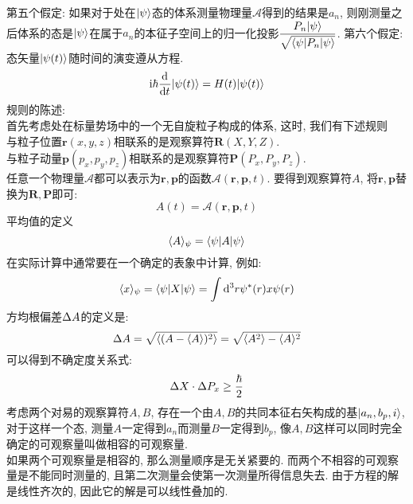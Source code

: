 \documentclass[UTF8]{ctexart}
\numberwithin{equation}{subsection}
\begin{document}
第五个假定: 如果对于处在$| {\psi} \rangle$态的体系测量物理量$\mathscr{A}$得到的结果是$a_n$, 则刚测量之后体系的态是$| {\psi} \rangle$在属于$a_n$的本征子空间上的归一化投影$\displaystyle \frac{P_n| {\psi} \rangle}{\sqrt{\langle {\psi|P_n|\psi} \rangle}}$.
第六个假定: 态矢量$| {\psi(t)} \rangle$随时间的演变遵从\sch 方程.
$$\mathrm{i}\hbar\frac{\mathrm{d}^{} }{\mathrm{d} t^{}}| {\psi(t)} \rangle=H(t)| {\psi(t)} \rangle$$
规则的陈述: \\
首先考虑处在标量势场中的一个无自旋粒子构成的体系, 这时, 我们有下述规则\\
与粒子位置$\bm{r}(x,y,z)$相联系的是观察算符$\bm{R}(X,Y,Z)$. \\
与粒子动量$\bm{p}(p_x,p_y,p_z)$相联系的是观察算符$\bm{P}(P_x,P_y,P_z)$.\\
任意一个物理量$\mathscr{A}$都可以表示为$\bm{r},\bm{p}$的函数$\mathscr{A}(\bm{r},\bm{p},t)$. 要得到观察算符$A$, 将$\bm{r},\bm{p}$替换为$\bm{R},\bm{P}$即可: 
$$A(t)=\mathscr{A}(\bm{r},\bm{p},t)$$
平均值的定义
$$\langle {A} \rangle_\psi=\langle {\psi|A|\psi} \rangle$$
在实际计算中通常要在一个确定的表象中计算, 例如:
$$\langle {x} \rangle_\psi=\langle {\psi|X|\psi} \rangle=\int\mathop{}\!\mathrm{d}^3r \psi^*(r)x\psi(r)$$
方均根偏差$\Delta A$的定义是: 
$$\Delta A=\sqrt{\langle {(A-\langle {A} \rangle)^2} \rangle}=\sqrt{\langle {A^2} \rangle-\langle {A} \rangle^2}$$
可以得到不确定度关系式:
$$\Delta X\cdot \Delta P_x \geq \frac{\hbar}{2}$$
考虑两个对易的观察算符$A,B$, 存在一个由$A,B$的共同本征右矢构成的基$| {a_n,b_p,i} \rangle$, 对于这样一个态, 测量$A$一定得到$a_n$而测量$B$一定得到$b_p$, 像$A,B$这样可以同时完全确定的可观察量叫做相容的可观察量. \\
如果两个可观察量是相容的, 那么测量顺序是无关紧要的. 而两个不相容的可观察量是不能同时测量的, 且第二次测量会使第一次测量所得信息失去. 
由于\sch 方程的解是线性齐次的, 因此它的解是可以线性叠加的. 
\end{document}
